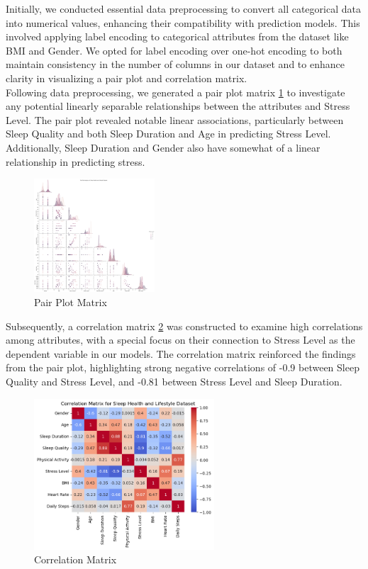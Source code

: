 \documentclass[11pt, letterpaper]{article}
\begin{document}
    \noindent Initially, we conducted essential data preprocessing to convert all categorical data into numerical values, enhancing their compatibility with prediction models. This involved applying label encoding to categorical attributes from the dataset like BMI and Gender. We opted for label encoding over one-hot encoding to both maintain consistency in the number of columns in our dataset and to enhance clarity in visualizing a pair plot and correlation matrix.\\
    
    \noindent Following data preprocessing, we generated a pair plot matrix \ref{fig:pairplot} to investigate any potential linearly separable relationships between the attributes and Stress Level. The pair plot revealed notable linear associations, particularly between Sleep Quality and both Sleep Duration and Age in predicting Stress Level. Additionally, Sleep Duration and Gender also have somewhat of a linear relationship in predicting stress.\\
    
    \begin{figure}[H]
        \centering
        \includegraphics[width=0.40\textwidth]{pairplot.png}
        \caption{Pair Plot Matrix}
        \label{fig:pairplot}
    \end{figure}

    \noindent Subsequently, a correlation matrix \ref{fig:correlation} was constructed to examine high correlations among attributes, with a special focus on their connection to Stress Level as the dependent variable in our models. The correlation matrix reinforced the findings from the pair plot, highlighting strong negative correlations of -0.9 between Sleep Quality and Stress Level, and -0.81 between Stress Level and Sleep Duration.
    
    \begin{figure}[H]
        \centering
        \includegraphics[width=0.60\textwidth]{correlation.png}
        \caption{Correlation Matrix}
        \label{fig:correlation}
    \end{figure}
\end{document}
